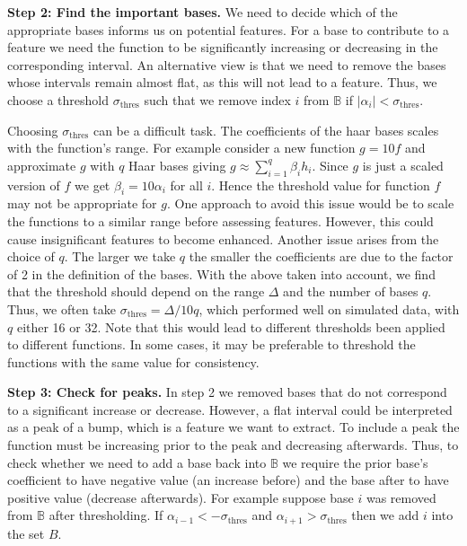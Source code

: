 \documentclass[12pt]{book} %
\begin{document}
{\bf Step 2: Find the important bases.} We need to decide which of the appropriate bases informs us on potential features. For a base to contribute to a feature we need the function to be significantly increasing or decreasing in the corresponding interval. An alternative view is that we need to remove the bases whose intervals remain almost flat, as this will not lead to a feature. Thus, we choose a threshold $\sigma_\mathrm{thres}$ such that we remove index $i$ from $\mathbb{B}$ if $|\alpha_i| < \sigma_\mathrm{thres}$.
 
 Choosing $\sigma_\mathrm{thres}$ can be a difficult task. The coefficients of the haar bases scales with the function's range. For example consider a new function $g = 10f$ and approximate $g$ with $q$ Haar bases giving $g \approx \sum^q_{i=1} \beta_i h_i$. Since $g$ is just a scaled version of $f$ we get $\beta_i = 10\alpha_i$ for all $i$. Hence the threshold value for function $f$ may not be appropriate for $g$. One approach to avoid this issue would be to scale the functions to a similar range before assessing features. However, this could cause insignificant features to become enhanced. Another issue arises from the choice of $q$. The larger we take $q$ the smaller the coefficients are due to the factor of 2 in the definition of the bases. With the above taken into account, we find that the threshold should depend on the range $\Delta$ and the number of bases $q$. Thus, we often take $\sigma_\mathrm{thres} = \Delta/10q $, which performed well on simulated data, with $q$ either 16 or 32. Note that this would lead to different thresholds been applied to different functions. In some cases, it may be preferable to threshold the functions with the same value for consistency.



 {\bf Step 3: Check for peaks.} In step 2 we removed bases that do not correspond to a significant increase or decrease. However, a flat interval could be interpreted as a peak of a bump, which is a feature we want to extract. To include a peak the function must be increasing prior to the peak and decreasing afterwards. Thus, to check whether we need to add a base back into $\mathbb{B}$ we require the prior base's coefficient to have negative value (an increase before) and the base after to have positive value (decrease afterwards). For example suppose base $i$ was removed from $\mathbb{B}$ after thresholding. If $\alpha_{i-1} < - \sigma_\mathrm{thres}$ and $\alpha_{i+1} > \sigma_\mathrm{thres}$ then we add $i$ into the set $B$.
 
\end{document}
